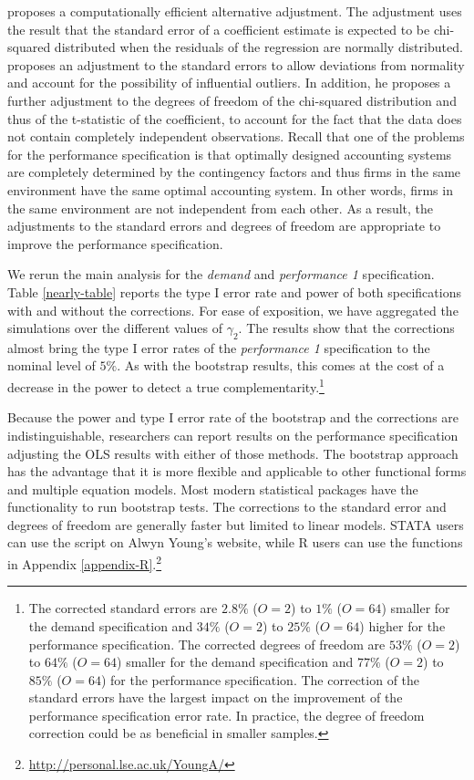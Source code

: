 \documentclass[12pt]{article}
\begin{document}


\citet{young_improved_2016} proposes a computationally efficient alternative adjustment. The adjustment uses the result that the standard error of a coefficient estimate is expected to be chi-squared distributed when the residuals of the regression are normally distributed. \cite{young_improved_2016} proposes an adjustment to the standard errors to allow deviations from normality and account for the possibility of influential outliers. In addition, he proposes a further adjustment to the degrees of freedom of the chi-squared distribution and thus of the t-statistic of the coefficient, to account for the fact that the data does not contain completely independent observations. Recall that one of the problems for the performance specification is that optimally designed accounting systems are completely determined by the contingency factors and thus firms in the same environment have the same optimal accounting system. In other words, firms in the same environment are not independent from each other. As a result, the adjustments to the standard errors and degrees of freedom are appropriate to improve the performance specification.

We rerun the main analysis for the \emph{demand} and \emph{performance 1} specification. Table \ref{nearly-table} reports the type I error rate and power of both specifications with and without the corrections. For ease of exposition, we have aggregated the simulations over the different values of $\gamma_2$. The results show that the corrections almost bring the type I error rates of the \emph{performance 1} specification to the nominal level of $5\%$. As with the bootstrap results, this comes at the cost of a decrease in the power to detect a true complementarity.\footnote{The corrected standard errors are $2.8\%$ ($O = 2$) to $1\%$ ($O = 64$) smaller for the demand specification and $34\%$ ($O = 2$) to $25\%$ ($O = 64$) higher for the performance specification. The corrected degrees of freedom are $53\%$ ($O = 2$) to $64\%$ ($O = 64$) smaller for the demand specification and $77\%$ ($O = 2$) to $85\%$ ($O = 64$) for the performance specification. The correction of the standard errors have the largest impact on the improvement of the performance specification error rate. In practice, the degree of freedom correction could be as beneficial in smaller samples.}



Because the power and type I error rate of the bootstrap and the \citet{young_improved_2016} corrections are indistinguishable, researchers can report results on the performance specification adjusting the OLS results with either of those methods. The bootstrap approach has the advantage that it is more flexible and applicable to other functional forms and multiple equation models. Most modern statistical packages have the functionality to run bootstrap tests. The corrections to the standard error and degrees of freedom are generally faster but limited to linear models. STATA users can use the script on Alwyn Young's website, while R users can use the functions in Appendix \ref{appendix-R}.\footnote{\url{http://personal.lse.ac.uk/YoungA/}}
\end{document}
